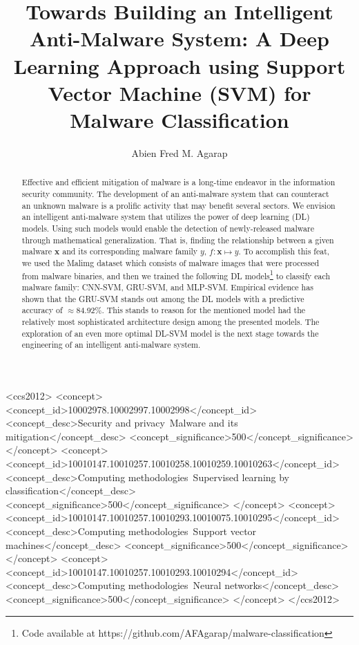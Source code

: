 \documentclass[sigconf]{acmart}
\renewcommand{\vec}[1]{\mathbf{#1}}
\begin{document}
\title{Towards Building an Intelligent Anti-Malware System: A Deep Learning Approach using Support Vector Machine (SVM) for Malware Classification}

\author{Abien Fred M. Agarap}

\begin{abstract}
Effective and efficient mitigation of malware is a long-time endeavor in the information security community. The development of an anti-malware system that can counteract an unknown malware is a prolific activity that may benefit several sectors. We envision an intelligent anti-malware system that utilizes the power of deep learning (DL) models. Using such models would enable the detection of newly-released malware through mathematical generalization. That is, finding the relationship between a given malware $\vec{x}$ and its corresponding malware family $y$, $f: \vec{x} \mapsto y$. To accomplish this feat, we used the Malimg dataset\cite{nataraj2011malware} which consists of malware images that were processed from malware binaries, and then we trained the following DL models\footnote{Code available at https://github.com/AFAgarap/malware-classification} to classify each malware family: CNN-SVM\cite{tang2013deep}, GRU-SVM\cite{agarap2017neural}, and MLP-SVM. Empirical evidence has shown that the GRU-SVM stands out among the DL models with a predictive accuracy of $\approx$84.92\%. This stands to reason for the mentioned model had the relatively most sophisticated architecture design among the presented models. The exploration of an even more optimal DL-SVM model is the next stage towards the engineering of an intelligent anti-malware system.
\end{abstract}

 \begin{CCSXML}
<ccs2012>
<concept>
<concept_id>10002978.10002997.10002998</concept_id>
<concept_desc>Security and privacy~Malware and its mitigation</concept_desc>
<concept_significance>500</concept_significance>
</concept>
<concept>
<concept_id>10010147.10010257.10010258.10010259.10010263</concept_id>
<concept_desc>Computing methodologies~Supervised learning by classification</concept_desc>
<concept_significance>500</concept_significance>
</concept>
<concept>
<concept_id>10010147.10010257.10010293.10010075.10010295</concept_id>
<concept_desc>Computing methodologies~Support vector machines</concept_desc>
<concept_significance>500</concept_significance>
</concept>
<concept>
<concept_id>10010147.10010257.10010293.10010294</concept_id>
<concept_desc>Computing methodologies~Neural networks</concept_desc>
<concept_significance>500</concept_significance>
</concept>
</ccs2012>
\end{CCSXML}
\end{document}
